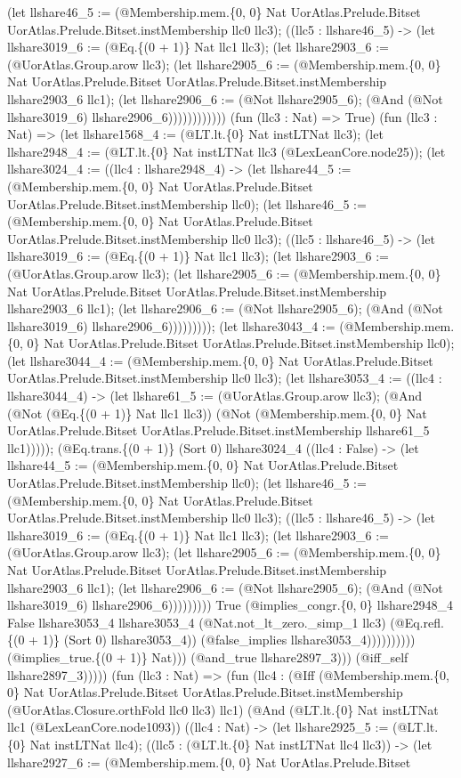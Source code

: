 \documentclass[11pt]{article}
\begin{document}
(let llshare46\_5 := (@Membership.mem.\{0, 0\} Nat UorAtlas.Prelude.Bitset UorAtlas.Prelude.Bitset.instMembership llc0 llc3); ((llc5 : llshare46\_5) -> (let llshare3019\_6 := (@Eq.\{(0 + 1)\} Nat llc1 llc3); (let llshare2903\_6 := (@UorAtlas.Group.arow llc3); (let llshare2905\_6 := (@Membership.mem.\{0, 0\} Nat UorAtlas.Prelude.Bitset UorAtlas.Prelude.Bitset.instMembership llshare2903\_6 llc1); (let llshare2906\_6 := (@Not llshare2905\_6); (@And (@Not llshare3019\_6) llshare2906\_6)))))))))))) (fun (llc3 : Nat) => True) (fun (llc3 : Nat) => (let llshare1568\_4 := (@LT.lt.\{0\} Nat instLTNat llc3); (let llshare2948\_4 := (@LT.lt.\{0\} Nat instLTNat llc3 (@LexLeanCore.node25)); (let llshare3024\_4 := ((llc4 : llshare2948\_4) -> (let llshare44\_5 := (@Membership.mem.\{0, 0\} Nat UorAtlas.Prelude.Bitset UorAtlas.Prelude.Bitset.instMembership llc0); (let llshare46\_5 := (@Membership.mem.\{0, 0\} Nat UorAtlas.Prelude.Bitset UorAtlas.Prelude.Bitset.instMembership llc0 llc3); ((llc5 : llshare46\_5) -> (let llshare3019\_6 := (@Eq.\{(0 + 1)\} Nat llc1 llc3); (let llshare2903\_6 := (@UorAtlas.Group.arow llc3); (let llshare2905\_6 := (@Membership.mem.\{0, 0\} Nat UorAtlas.Prelude.Bitset UorAtlas.Prelude.Bitset.instMembership llshare2903\_6 llc1); (let llshare2906\_6 := (@Not llshare2905\_6); (@And (@Not llshare3019\_6) llshare2906\_6))))))))); (let llshare3043\_4 := (@Membership.mem.\{0, 0\} Nat UorAtlas.Prelude.Bitset UorAtlas.Prelude.Bitset.instMembership llc0); (let llshare3044\_4 := (@Membership.mem.\{0, 0\} Nat UorAtlas.Prelude.Bitset UorAtlas.Prelude.Bitset.instMembership llc0 llc3); (let llshare3053\_4 := ((llc4 : llshare3044\_4) -> (let llshare61\_5 := (@UorAtlas.Group.arow llc3); (@And (@Not (@Eq.\{(0 + 1)\} Nat llc1 llc3)) (@Not (@Membership.mem.\{0, 0\} Nat UorAtlas.Prelude.Bitset UorAtlas.Prelude.Bitset.instMembership llshare61\_5 llc1))))); (@Eq.trans.\{(0 + 1)\} (Sort 0) llshare3024\_4 ((llc4 : False) -> (let llshare44\_5 := (@Membership.mem.\{0, 0\} Nat UorAtlas.Prelude.Bitset UorAtlas.Prelude.Bitset.instMembership llc0); (let llshare46\_5 := (@Membership.mem.\{0, 0\} Nat UorAtlas.Prelude.Bitset UorAtlas.Prelude.Bitset.instMembership llc0 llc3); ((llc5 : llshare46\_5) -> (let llshare3019\_6 := (@Eq.\{(0 + 1)\} Nat llc1 llc3); (let llshare2903\_6 := (@UorAtlas.Group.arow llc3); (let llshare2905\_6 := (@Membership.mem.\{0, 0\} Nat UorAtlas.Prelude.Bitset UorAtlas.Prelude.Bitset.instMembership llshare2903\_6 llc1); (let llshare2906\_6 := (@Not llshare2905\_6); (@And (@Not llshare3019\_6) llshare2906\_6))))))))) True (@implies\_congr.\{0, 0\} llshare2948\_4 False llshare3053\_4 llshare3053\_4 (@Nat.not\_lt\_zero.\_simp\_1 llc3) (@Eq.refl.\{(0 + 1)\} (Sort 0) llshare3053\_4)) (@false\_implies llshare3053\_4)))))))))) (@implies\_true.\{(0 + 1)\} Nat))) (@and\_true llshare2897\_3))) (@iff\_self llshare2897\_3))))) (fun (llc3 : Nat) => (fun (llc4 : (@Iff (@Membership.mem.\{0, 0\} Nat UorAtlas.Prelude.Bitset UorAtlas.Prelude.Bitset.instMembership (@UorAtlas.Closure.orthFold llc0 llc3) llc1) (@And (@LT.lt.\{0\} Nat instLTNat llc1 (@LexLeanCore.node1093)) ((llc4 : Nat) -> (let llshare2925\_5 := (@LT.lt.\{0\} Nat instLTNat llc4); ((llc5 : (@LT.lt.\{0\} Nat instLTNat llc4 llc3)) -> (let llshare2927\_6 := (@Membership.mem.\{0, 0\} Nat UorAtlas.Prelude.Bitset 
\end{document}
